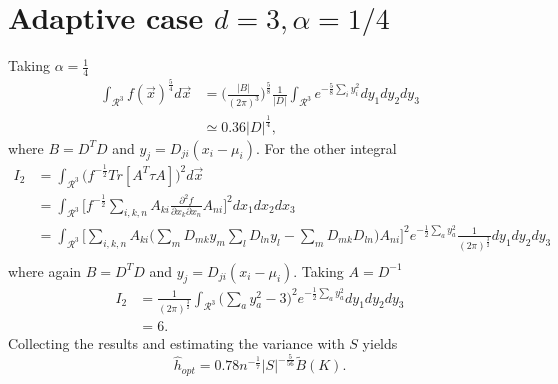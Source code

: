 \section{Adaptive case $d=3,\alpha=1/4$}
Taking $\alpha=\frac{1}{4}$
\begin{equation}
	\begin{split}
		\int_{\mathcal{R}^3}f(\vec{x})^{\frac{5}{4}}d\vec{x}&=\bigg(\frac{|B|}{(2\pi)^3}\bigg)^\frac{5}{8}\frac{1}{|D|}\int_{\mathcal{R}^3}e^{-\frac{5}{8}\sum_iy_i^2}dy_1dy_2dy_3\\
		&\simeq 0.36|D|^\frac{1}{4},
	\end{split}
\end{equation}
where $B=D^TD$ and $y_j=D_{ji}(x_i-\mu_i)$. For the other integral
\begin{equation}
	\begin{split}
		I_2&=\int_{\mathcal{R}^3} \big(f^{-\frac{1}{2}}Tr[A^T\tau A]\big)^2d\vec{x}\\
		&=\int_{\mathcal{R}^3}\bigg[f^{-\frac{1}{2}}\sum_{i,k,n}A_{ki}\frac{\partial^2 f}{\partial x_k\partial x_n}A_{ni}\bigg]^2dx_1dx_2dx_3\\
		&=\int_{\mathcal{R}^3}\bigg[\sum_{i,k,n}A_{ki}\bigg(\sum_mD_{mk}y_m\sum_lD_{ln}y_l-\sum_{m}D_{mk}D_{ln}\bigg)A_{ni}\bigg]^2e^{-\frac{1}{2}\sum_a y_a^2}\frac{1}{(2\pi)^\frac{3}{2}}dy_1dy_2dy_3\\
	\end{split}
\end{equation}
where again $B=D^TD$ and $y_j=D_{ji}(x_i-\mu_i)$. Taking $A=D^{-1}$ 
\begin{equation}
	\begin{split}
		I_2&=\frac{1}{(2\pi)^\frac{3}{2}}\int_{\mathcal{R}^3} \bigg(\sum_ay_a^2-3\bigg)^2e^{-\frac{1}{2}\sum_a y_a^2}dy_1dy_2dy_3\\
		&=6.
	\end{split}
\end{equation}
Collecting the results and estimating the variance with $S$ yields
\begin{equation}
	\hat{h}_{opt}= 0.78n^{-\frac{1}{7}}|S|^{-\frac{5}{56}}\tilde{B}(K).
\end{equation}